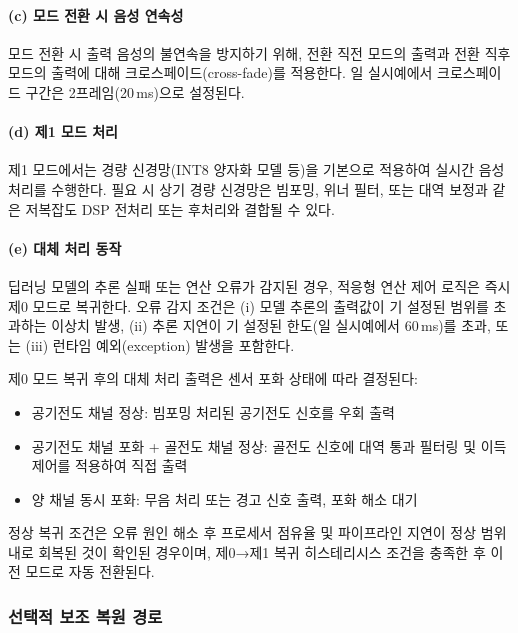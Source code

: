 \documentclass{article}
\DeclareRobustCommand{\codexedit}[1]{\textcolor{customorange}{#1}}
\begin{document}
\paragraph{(c) 모드 전환 시 음성 연속성}

모드 전환 시 출력 음성의 불연속을 방지하기 위해, 전환 직전 모드의 출력과 전환 직후 모드의 출력에 대해 크로스페이드(cross-fade)를 적용한다. 일 실시예에서 크로스페이드 구간은 2프레임(20\,ms)으로 설정된다.

\paragraph{(d) 제1 모드 처리}

\codexedit{제1 모드에서는 경량 신경망(INT8 양자화 모델 등)을 기본으로 적용하여 실시간 음성 처리를 수행한다. 필요 시 상기 경량 신경망은 빔포밍, 위너 필터, 또는 대역 보정과 같은 저복잡도 DSP 전처리 또는 후처리와 결합될 수 있다.}

\paragraph{(e) 대체 처리 동작}

\codexedit{딥러닝 모델의 추론 실패 또는 연산 오류가 감지된 경우, 적응형 연산 제어 로직은 즉시 제0 모드로 복귀한다. 오류 감지 조건은 (i) 모델 추론의 출력값이 기 설정된 범위를 초과하는 이상치 발생, (ii) 추론 지연이 기 설정된 한도(일 실시예에서 60\,ms)를 초과, 또는 (iii) 런타임 예외(exception) 발생을 포함한다.}

\codexedit{제0 모드 복귀 후의 대체 처리 출력은 센서 포화 상태에 따라 결정된다:}
\begin{itemize}
    \item 공기전도 채널 정상: 빔포밍 처리된 공기전도 신호를 우회 출력
    \item 공기전도 채널 포화 + 골전도 채널 정상: 골전도 신호에 대역 통과 필터링 및 이득 제어를 적용하여 직접 출력
    \item 양 채널 동시 포화: 무음 처리 또는 경고 신호 출력, 포화 해소 대기
\end{itemize}

정상 복귀 조건은 오류 원인 해소 후 프로세서 점유율 및 파이프라인 지연이 정상 범위 내로 회복된 것이 확인된 경우이며, 제0→제1 복귀 히스테리시스 조건을 충족한 후 이전 모드로 자동 전환된다.

\subsubsection{선택적 보조 복원 경로}
\end{document}
